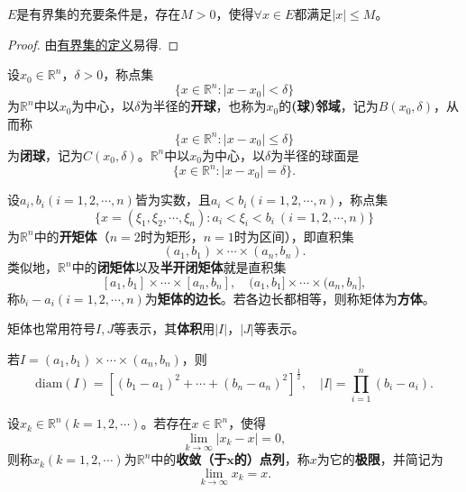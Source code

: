 \documentclass[lang=cn,newtx,10pt,scheme=chinese]{../Template/elegantbook}
\begin{document}
\begin{proposition}[有界集的充要条件]\label{proposition:有界集的充要条件}
  \(E\)是有界集的充要条件是，存在\(M > 0\)，使得\(\forall x\in E\)都满足\(|x|\leqslant M\)。
\end{proposition}
\begin{proof}
  由\hyperref[definition:点集的直径与有界集]{有界集的定义}易得.
\end{proof}

\begin{definition}[点的(球)邻域]\label{definition:点的(球)邻域}
  设\(x_0\in\mathbb{R}^n\)，\(\delta>0\)，称点集
\[\{x\in\mathbb{R}^n:|x - x_0|<\delta\}\]
为\(\mathbb{R}^n\)中以\(x_0\)为中心，以\(\delta\)为半径的\textbf{开球}，也称为\(x_0\)的\textbf{(球)邻域}，记为\(B(x_0,\delta)\)，从而称
\[\{x\in\mathbb{R}^n:|x - x_0|\leqslant\delta\}\]
为\textbf{闭球}，记为\(C(x_0,\delta)\)。\(\mathbb{R}^n\)中以\(x_0\)为中心，以\(\delta\)为半径的球面是
\[\{x\in\mathbb{R}^n:|x - x_0|=\delta\}.\]
\end{definition}

\begin{definition}[矩体]
设\(a_i,b_i(i = 1,2,\cdots,n)\)皆为实数，且\(a_i < b_i(i = 1,2,\cdots,n)\)，称点集
\[\{x = (\xi_1,\xi_2,\cdots,\xi_n):a_i<\xi_i < b_i\ (i = 1,2,\cdots,n)\}\]
为\(\mathbb{R}^n\)中的\textbf{开矩体}（\(n = 2\)时为矩形，\(n = 1\)时为区间），即直积集
\[(a_1,b_1)\times\cdots\times(a_n,b_n).\]
类似地，\(\mathbb{R}^n\)中的\textbf{闭矩体}以及\textbf{半开闭矩体}就是直积集
\[[a_1,b_1]\times\cdots\times[a_n,b_n],\quad(a_1,b_1]\times\cdots\times(a_n,b_n],\]
称\(b_i - a_i(i = 1,2,\cdots,n)\)为\textbf{矩体的边长}。若各边长都相等，则称矩体为\textbf{方体}。

矩体也常用符号\(I,J\)等表示，其\textbf{体积}用\(|I|\)，\(|J|\)等表示。
\end{definition}

\begin{proposition}[矩体的直径与体积]\label{proposition:矩体的直径与体积}
  若\(I=(a_1,b_1)\times\cdots\times(a_n,b_n)\)，则
\[\text{diam}(I)=[(b_1 - a_1)^2+\cdots+(b_n - a_n)^2]^{\frac{1}{2}},\quad |I|=\prod_{i = 1}^{n}(b_i - a_i).\]
\end{proposition}

\begin{definition}
  设\(x_k\in\mathbb{R}^n(k = 1,2,\cdots)\)。若存在\(x\in\mathbb{R}^n\)，使得
\[\lim_{k\rightarrow\infty}|x_k - x| = 0,\]
则称\(x_k(k = 1,2,\cdots)\)为\(\mathbb{R}^n\)中的\textbf{收敛（于\(\boldsymbol{x}\)的）点列}，称\(x\)为它的\textbf{极限}，并简记为
\[\lim_{k\rightarrow\infty}x_k = x.\]
\end{definition}
\end{document}
